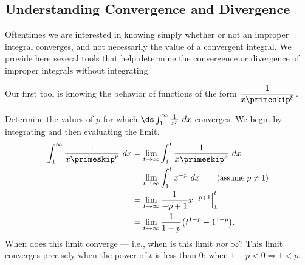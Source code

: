 \subsection{Understanding Convergence and Divergence}

Oftentimes we are interested in knowing simply whether or not an improper integral converges, and not necessarily the value of a convergent integral. We provide here several tools that help determine the convergence or divergence of improper integrals without integrating.

Our first tool is knowing the behavior of functions of the form $\dfrac1{x\primeskip^p}$.

\begin{example}\label{ex_impint4}
Determine the values of $p$ for which $\ds \int_1^\infty \frac1{x^p}\ dx$ converges.
\solution
We begin by integrating and then evaluating the limit.
\begin{align*}
	\int_1^\infty \frac1{x\primeskip^p}\ dx
	&= \lim_{t\to\infty}\int_1^t\frac1{x\primeskip^p}\ dx\\
	&= \lim_{t\to\infty}\int_1^t x^{-p}\ dx \qquad \text{\small (assume $p\neq 1$)}\\
	&= \lim_{t\to\infty} \frac{1}{-p+1}x^{-p+1}\Big|_1^t\\
	&= \lim_{t\to\infty} \frac{1}{1-p}\big(t^{1-p}-1^{1-p}\big).\\
\end{align*}
%
%
%
When does this limit converge --- i.e., when is this limit \textit{not} $\infty$? This limit converges precisely when the power of $t$ is less than 0: when $1-p<0 \Rightarrow 1<p$. 


\end{example}
